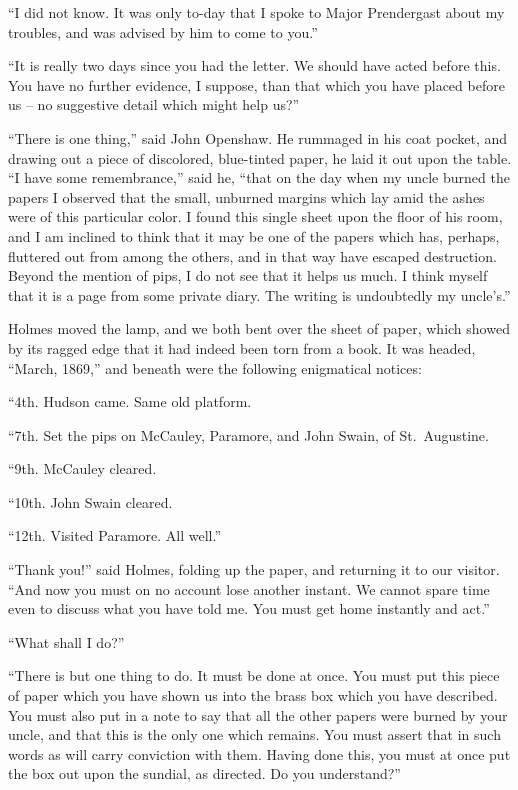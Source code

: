 “I did not know. It was only to-day that I spoke to Major
Prendergast about my troubles, and was advised by him to
come to you.”

“It is really two days since you had the letter. We should
have acted before this. You have no further evidence, I suppose,
than that which you have placed before us -- no suggestive
detail which might help us?”

“There is one thing,” said John Openshaw. He rummaged
in his coat pocket, and drawing out a piece of discolored,
blue-tinted paper, he laid it out upon the table. “I have
some remembrance,” said he, “that on the day when my uncle
burned the papers I observed that the small, unburned margins
which lay amid the ashes were of this particular color.
I found this single sheet upon the floor of his room, and I am
inclined to think that it may be one of the papers which has,
perhaps, fluttered out from among the others, and in that way
have escaped destruction. Beyond the mention of pips, I do
not see that it helps us much. I think myself that it is a
page from some private diary. The writing is undoubtedly
my uncle’s.”

Holmes moved the lamp, and we both bent over the sheet
of paper, which showed by its ragged edge that it had indeed
been torn from a book. It was headed, “March, 1869,” and
beneath were the following enigmatical notices:

“4th. Hudson came. Same old platform.

“7th. Set the pips on McCauley, Paramore, and John
Swain, of St.~Augustine.

“9th. McCauley cleared.

“10th. John Swain cleared.

“12th. Visited Paramore. All well.”

“Thank you!” said Holmes, folding up the paper, and returning
it to our visitor. “And now you must on no account
lose another instant. We cannot spare time even to discuss
what you have told me. You must get home instantly and
act.”

“What shall I do?”

“There is but one thing to do. It must be done at once.
You must put this piece of paper which you have shown us
into the brass box which you have described. You must also
put in a note to say that all the other papers were burned by
your uncle, and that this is the only one which remains. You
must assert that in such words as will carry conviction with
them. Having done this, you must at once put the box out
upon the sundial, as directed. Do you understand?”

